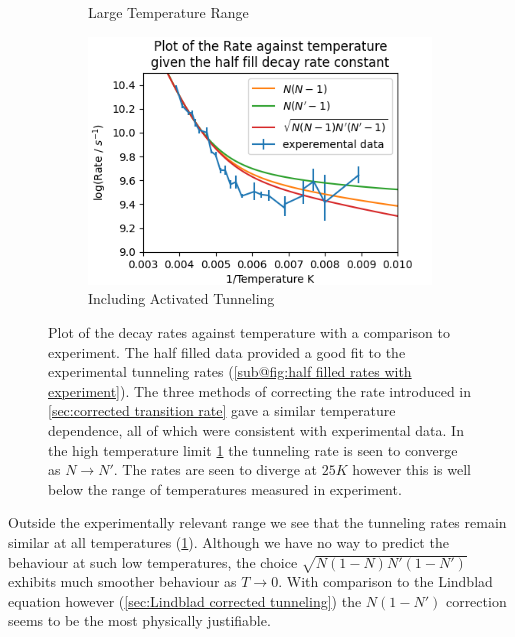 \begin{figure}[htbp]
\begin{subfigure}{0.3\linewidth}
        \caption{Large Temperature Range
        }\label{sub@fig:simulation temperature dependence comparison}
    \end{subfigure}
    \hfill
    \begin{subfigure}{0.3\linewidth}
        \centering
        \includegraphics[width = 0.9\linewidth]{Figures/Simulation/Decay rate against temperature half fill 150K 1 spin with correction.png}
        \caption{Including Activated Tunneling
        }
    \end{subfigure}
    \caption{Plot of the decay rates
        against temperature with a comparison
        to experiment. The half
        filled data provided a good
        fit to the experimental
        tunneling rates
        (\cref{sub@fig:half filled rates with experiment}).
        The three methods of correcting
        the rate introduced in
        \cref{sec:corrected transition rate}
        gave a similar temperature
        dependence, all of which were consistent
        with experimental
        data. In
        the high temperature
        limit
        \cref{sub@fig:simulation temperature dependence comparison}
        the tunneling
        rate is seen to converge
        as \(N\rightarrow{}N'\).
        The rates are seen to diverge
        at \(25K\) however this is well
        below the range of temperatures
        measured in experiment.
    }\label{fig:simulation-experiment comparison}
\end{figure}
Outside the experimentally
relevant range we see that the
tunneling rates remain
similar at all temperatures
(\cref{sub@fig:simulation temperature dependence comparison}).
Although we have no way
to predict the behaviour at
such low temperatures, the
choice \(\sqrt{N(1-N)N'(1-N')}\)
exhibits much smoother
behaviour as \(T\rightarrow{}0\).
With comparison to the Lindblad
equation however
(\cref{sec:Lindblad corrected tunneling})
the \(N(1-N')\)
correction seems to be the
most physically justifiable.

